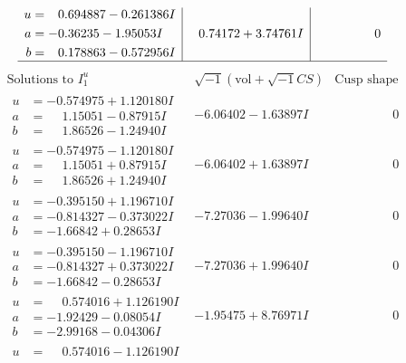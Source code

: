 \documentclass[1p]{elsarticle_modified}
\theoremstyle{definition}
\newcommand{\I}{\sqrt{-1}}
\begin{document}
$$\begin{array}{c|c|c}
\begin{aligned}
u &= \phantom{-}0.694887 - 0.261386 I \\
a &= -0.36235 - 1.95053 I \\
b &= \phantom{-}0.178863 - 0.572956 I\end{aligned}
 & \phantom{-}0.74172 + 3.74761 I & \phantom{-0.000000 } 0\\
 \hline 
 \end{array}$$\newpage$$\begin{array}{c|c|c}  
\text{Solutions to }I^u_{1}& \I (\text{vol} + \sqrt{-1}CS) & \text{Cusp shape}\\
 \hline 
\begin{aligned}
u &= -0.574975 + 1.120180 I \\
a &= \phantom{-}1.15051 - 0.87915 I \\
b &= \phantom{-}1.86526 - 1.24940 I\end{aligned}
 & -6.06402 - 1.63897 I & \phantom{-0.000000 } 0 \\ \hline\begin{aligned}
u &= -0.574975 - 1.120180 I \\
a &= \phantom{-}1.15051 + 0.87915 I \\
b &= \phantom{-}1.86526 + 1.24940 I\end{aligned}
 & -6.06402 + 1.63897 I & \phantom{-0.000000 } 0 \\ \hline\begin{aligned}
u &= -0.395150 + 1.196710 I \\
a &= -0.814327 - 0.373022 I \\
b &= -1.66842 + 0.28653 I\end{aligned}
 & -7.27036 - 1.99640 I & \phantom{-0.000000 } 0 \\ \hline\begin{aligned}
u &= -0.395150 - 1.196710 I \\
a &= -0.814327 + 0.373022 I \\
b &= -1.66842 - 0.28653 I\end{aligned}
 & -7.27036 + 1.99640 I & \phantom{-0.000000 } 0 \\ \hline\begin{aligned}
u &= \phantom{-}0.574016 + 1.126190 I \\
a &= -1.92429 - 0.08054 I \\
b &= -2.99168 - 0.04306 I\end{aligned}
 & -1.95475 + 8.76971 I & \phantom{-0.000000 } 0 \\ \hline\begin{aligned}
u &= \phantom{-}0.574016 - 1.126190 I \\

\end{aligned}
\end{array}$$
\end{document}
